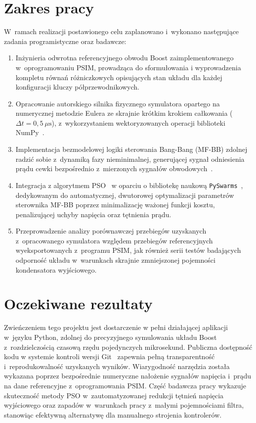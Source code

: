 \section{Zakres pracy}
\label{sec:zakres}

W~ramach realizacji postawionego celu zaplanowano i~wykonano następujące zadania programistyczne oraz badawcze:

\begin{enumerate}
	\item Inżynieria odwrotna referencyjnego obwodu Boost zaimplementowanego w~oprogramowaniu PSIM, prowadząca do sformułowania i wyprowadzenia kompletu równań różniczkowych opisujących stan układu dla każdej konfiguracji kluczy półprzewodnikowych.
	\item Opracowanie autorskiego silnika fizycznego symulatora opartego na numerycznej metodzie Eulera ze skrajnie krótkim krokiem całkowania ($\Delta t = 0{,}5~\mu\mathrm{s}$), z~wykorzystaniem wektoryzowanych operacji biblioteki NumPy~\cite{harris2020numpy}.
	\item Implementacja bezmodelowej logiki sterowania Bang-Bang (MF-BB) zdolnej radzić sobie z~dynamiką fazy nieminimalnej, generującej sygnał odniesienia prądu cewki bezpośrednio z~mierzonych sygnałów obwodowych~\cite{tatari2024mfbb}.
	\item Integracja z algorytmem PSO~\cite{kennedy1995pso, shi1998pso} w oparciu o bibliotekę naukową \texttt{PySwarms}~\cite{miranda2018pyswarms}, dedykowanym do automatycznej, dwutorowej optymalizacji parametrów sterownika MF-BB poprzez minimalizację ważonej funkcji kosztu, penalizującej uchyby napięcia oraz tętnienia prądu.
	\item Przeprowadzenie analizy porównawczej przebiegów uzyskanych z~opracowanego symulatora względem przebiegów referencyjnych wyeksportowanych z~programu PSIM, jak również serii testów badających odporność układu w~warunkach skrajnie zmniejszonej pojemności kondensatora wyjściowego.
\end{enumerate}

\section{Oczekiwane rezultaty}
\label{sec:rezultaty}
Zwieńczeniem tego projektu jest dostarczenie w pełni działającej aplikacji w~języku Python, zdolnej do precyzyjnego symulowania układu Boost z~rozdzielczością czasową rzędu pojedynczych mikrosekund. Publiczna dostępność kodu w systemie kontroli wersji Git~\cite{chacon2014progit} zapewnia pełną transparentność i~reprodukowalność uzyskanych wyników. Wiarygodność narzędzia została wykazana poprzez bezpośrednie numeryczne nałożenie sygnałów napięcia i~prądu na dane referencyjne z~oprogramowania PSIM. Część badawcza pracy wykazuje skuteczność metody PSO w~zautomatyzowanej redukcji tętnień napięcia wyjściowego oraz zapadów w~warunkach pracy z~małymi pojemnościami filtra, stanowiąc efektywną alternatywę dla manualnego strojenia kontrolerów.

